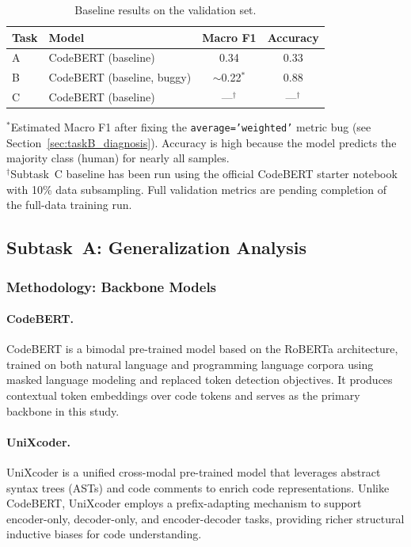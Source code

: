 \documentclass[11pt]{article}
\begin{document}
\begin{table}[ht]
\centering
\small
\begin{tabularx}{\columnwidth}{@{}l X c c@{}}
\toprule
\textbf{Task} & \textbf{Model} & \textbf{Macro F1} & \textbf{Accuracy} \\ \midrule
A & CodeBERT (baseline) & 0.34 & 0.33 \\
B & CodeBERT (baseline, buggy) & $\sim$0.22$^*$ & 0.88 \\
C & CodeBERT (baseline) & ---$^\dagger$ & ---$^\dagger$ \\
\bottomrule
\end{tabularx}
\begin{minipage}{\columnwidth}
\small $^*$Estimated Macro F1 after fixing the \texttt{average='weighted'} metric bug (see Section~\ref{sec:taskB_diagnosis}). Accuracy is high because the model predicts the majority class (human) for nearly all samples.\\
$^\dagger$Subtask~C baseline has been run using the official CodeBERT starter notebook with 10\% data subsampling. Full validation metrics are pending completion of the full-data training run.
\end{minipage}
\caption{Baseline results on the validation set.}
\label{tab:baseline_results}
\end{table}

\subsection{Subtask~A: Generalization Analysis}
\subsubsection{Methodology: Backbone Models}
\paragraph{CodeBERT.} CodeBERT is a bimodal pre-trained model
based on the RoBERTa architecture, trained on both natural language and programming
language corpora using masked language modeling and replaced token detection objectives.
It produces contextual token embeddings over code tokens and serves as the primary
backbone in this study.

\paragraph{UniXcoder.} UniXcoder is a unified cross-modal
pre-trained model that leverages abstract syntax trees (ASTs) and code comments to
enrich code representations. Unlike CodeBERT, UniXcoder employs a prefix-adapting
mechanism to support encoder-only, decoder-only, and encoder-decoder tasks, providing
richer structural inductive biases for code understanding.
\end{document}

